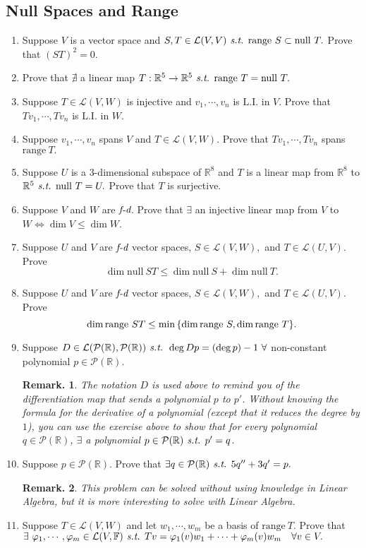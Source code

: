 \documentclass[11pt, letterpaper]{article}
\newtheorem*{rmk}{Remark.}
\def\R{\mathbb{R}}
\def\F{\mathbb{F}}
\def\P{\mathcal{P}}
\def\L{\mathcal{L}}
\def\phi{\varphi}
\def\st{\emph{ s.t. }}
\def\LI{\mathrm{L.I.}}
\def\FD{\emph{f-d}}
\def\Null{\mathrm{null\ }}
\def\range{\mathrm{range\ }}
\begin{document}
\subsection{Null Spaces and Range}
\begin{enumerate}
	\item Suppose $V$ is a vector space and $S,T\in\L(V,V)\st\range S\subset\Null T.$ Prove that $(ST)^2=0.$
	\item Prove that $\nexists$ a linear map $T:\R^5\to\R^5\st\range T=\Null T.$
	\item Suppose $T\in\L(V,W)$ is injective and $v_1,\cdots,v_n$ is $\LI$ in $V$. Prove that $Tv_1,\cdots,Tv_n$ is $\LI$ in $W$.
	\item Suppose $v_1,\cdots,v_n$ spans $V$ and $T\in\L(V,W).$ Prove that $Tv_1,\cdots,Tv_n$ spans $\range T.$
	\item Suppose $U$ is a $3$-dimensional subspace of $\R^8$ and $T$ is a linear map from $\R^8$ to $\R^5\st \Null T=U.$ Prove that $T$ is surjective. 
	\item Suppose $V$ and $W$ are $\FD$. Prove that $\exists$ an injective linear map from $V$ to $W\iff\dim V\leq\dim W$.
	\item Suppose $U$ and $V$ are $\FD$ vector spaces, $S\in\L(V,W),$ and $T\in\L(U,V).$ Prove \[\dim\Null ST\leq\dim\Null S+\dim\Null T.\]
	\item Suppose $U$ and $V$ are $\FD$ vector spaces, $S\in\L(V,W),$ and $T\in\L(U,V).$ Prove \[\dim\range ST\leq\min\qty{\dim\range S,\dim\range T}.\]
	\item Suppose $D\in\L(\P(\R),\P(\R))\st \deg Dp=(\deg p)-1\ \forall$ non-constant polynomial $p\in\P(\R).$ \begin{rmk}The notation $D$ is used above to remind you of the differentiation map that sends a polynomial $p$ to $p'$. Without knowing the formula for the derivative of a polynomial (except that it reduces the degree by $1$), you can use the exercise above to show that for every polynomial $q\in\P(\R)$, $\exists$ a polynomial $p\in\P(\R)\st p'=q$.\end{rmk}
	\item Suppose $p\in\P(\R).$ Prove that $\exists q\in\P(\R)\st 5q''+3q'=p.$\begin{rmk}This problem can be solved without using knowledge in Linear Algebra, but it is more interesting to solve with Linear Algebra.\end{rmk}
	\item Suppose $T\in\L(V,W)$ and let $w_1,\cdots,w_m$ be a basis of $\range T.$ Prove that $\exists\ \phi_1,\cdots,\phi_m\in\L(V,\F)\st Tv=\phi_1(v)w_1+\cdots+\phi_m(v)w_m\quad\forall v\in V.$
\end{enumerate}
\end{document}
